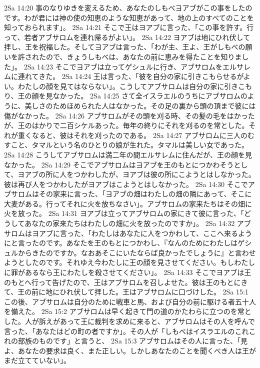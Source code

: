 2Sa 14:20  事のなりゆきを変えるため、あなたのしもべヨアブがこの事をしたのです。わが君には神の使の知恵のような知恵があって、地の上のすべてのことを知っておられます」。
2Sa 14:21  そこで王はヨアブに言った、「この事を許す。行って、若者アブサロムを連れ帰るがよい」。
2Sa 14:22  ヨアブは地にひれ伏して拝し、王を祝福した。そしてヨアブは言った、「わが主、王よ、王がしもべの願いを許されたので、きょうしもべは、あなたの前に恵みを得たことを知りました」。
2Sa 14:23  そこでヨアブは立ってゲシュルに行き、アブサロムをエルサレムに連れてきた。
2Sa 14:24  王は言った、「彼を自分の家に引きこもらせるがよい。わたしの顔を見てはならない」。こうしてアブサロムは自分の家に引きこもり、王の顔を見なかった。
2Sa 14:25  さて全イスラエルのうちにアブサロムのように、美しさのためほめられた人はなかった。その足の裏から頭の頂まで彼には傷がなかった。
2Sa 14:26  アブサロムがその頭を刈る時、その髪の毛をはかったが、王のはかりで二百シケルあった。毎年の終りにそれを刈るのを常とした。それが重くなると、彼はそれを刈ったのである。
2Sa 14:27  アブサロムに三人のむすこと、タマルという名のひとりの娘が生れた。タマルは美しい女であった。
2Sa 14:28  こうしてアブサロムは満二年の間エルサレムに住んだが、王の顔を見なかった。
2Sa 14:29  そこでアブサロムはヨアブを王のもとにつかわそうとして、ヨアブの所に人をつかわしたが、ヨアブは彼の所にこようとはしなかった。彼は再び人をつかわしたがヨアブはこようとはしなかった。
2Sa 14:30  そこでアブサロムはその家来に言った、「ヨアブの畑はわたしの畑の隣にあって、そこに大麦がある。行ってそれに火を放ちなさい」。アブサロムの家来たちはその畑に火を放った。
2Sa 14:31  ヨアブは立ってアブサロムの家にきて彼に言った、「どうしてあなたの家来たちはわたしの畑に火を放ったのですか」。
2Sa 14:32  アブサロムはヨアブに言った、「わたしはあなたに人をつかわして、ここへ来るようにと言ったのです。あなたを王のもとにつかわし、『なんのためにわたしはゲシュルからきたのですか。なおあそこにいたならば良かったでしょうに』と言わせようとしたのです。それゆえ今わたしに王の顔を見させてください。もしわたしに罪があるなら王にわたしを殺させてください」。
2Sa 14:33  そこでヨアブは王のもとへ行って告げたので、王はアブサロムを召しよせた。彼は王のもとにきて、王の前に地にひれ伏して拝した。王はアブサロムに口づけした。
2Sa 15:1  この後、アブサロムは自分のために戦車と馬、および自分の前に駆ける者五十人を備えた。
2Sa 15:2  アブサロムは早く起きて門の道のかたわらに立つのを常とした。人が訴えがあって王に裁判を求めに来ると、アブサロムはその人を呼んで言った、「あなたはどの町の者ですか」。その人が「しもべはイスラエルのこれこれの部族のものです」と言うと、
2Sa 15:3  アブサロムはその人に言った、「見よ、あなたの要求は良く、また正しい。しかしあなたのことを聞くべき人は王がまだ立てていない」。
